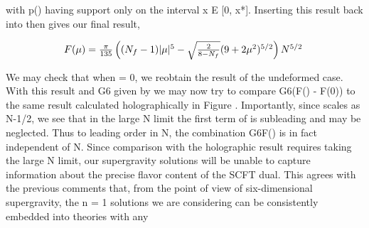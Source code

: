 \documentclass{article}
\begin{document}
with p() having support only on the interval x E [0, x*]. Inserting this result back into then
gives our final result,


\begin{equation}
\begin{array} { c c } { F ( \mu ) = \frac { \pi } { 1 3 5 } \left ( ( N _ { f } - 1 ) | \mu | ^ { 5 } - \sqrt { \frac { 2 } { 8 - N _ { f } } } ( 9 + 2 \mu ^ { 2 } ) ^ { 5 / 2 } \right ) N ^ { 5 / 2 } ~ }\end{array}
\end{equation}


We may check that when  = 0, we reobtain the result of the undeformed case. With this
result and G6 given by we may now try to compare G6(F() - F(0)) to the same result
calculated holographically in Figure . Importantly, since  scales as N-1/2, we see that in
the large N limit the first term of is subleading and may be neglected. Thus to leading
order in N, the combination G6F() is in fact independent of N. Since comparison with
the holographic result requires taking the large N limit, our supergravity solutions will be
unable to capture information about the precise flavor content of the SCFT dual. This agrees
with the previous comments that, from the point of view of six-dimensional supergravity,
the n = 1 solutions we are considering can be consistently embedded into theories with any
\end{document}
